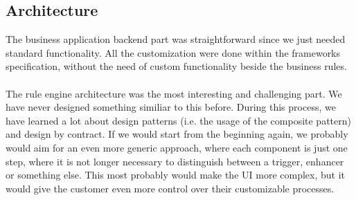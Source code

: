 \documentclass[11pt]{article} %
\begin{document}
\subsection{Architecture}
The business application backend part was straightforward since we just needed standard functionality. All the customization were done within the frameworks specification, without the need of custom functionality beside the business rules.\\
\\
The rule engine architecture was the most interesting and challenging part. We have never designed something similiar to this before. During this process, we have learned a lot about design patterns (i.e. the usage of the composite pattern) and design by contract. If we would start from the beginning again, we probably would aim for an even more generic approach, where each component is just one step, where it is not longer necessary to distinguish between a trigger, enhancer or something else. This most probably would make the UI more complex, but it would give the customer even more control over their customizable processes.
\newpage
\end{document}
